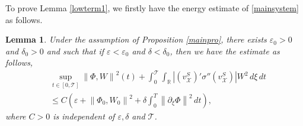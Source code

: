 \documentclass[12pt,reqno]{amsart}
\numberwithin{equation}{section}
\newcommand{\norm}[1]{\left\lVert #1 \right\rVert}
\def\p{\partial}
\def\R{\mathbb{R}}
\def\T{\mathcal{T}}
\def\vsx{v^S_{\mathcal{X}}}
\newtheorem{lemma}[theorem]{Lemma}
\begin{document}
To prove Lemma \ref{lowterm1}, we firstly have the energy estimate of \eqref{mainsystem} as follows.
\begin{lemma}\label{construction}
	Under the assumption of Proposition \ref{mainpro}, there exists $\varepsilon_0>0$ and $\delta_0>0$ and such that if $\varepsilon<\varepsilon_0$ and $\delta<\delta_0$, then we have the estimate as follows,
	\begin{equation}\label{transformestimate}
		\begin{aligned}
			&\mathop{sup}\limits_{t \in [0,\T]}\norm{\Phi,W}^2(t) +\int_{0}^{\T}\int_{\R} |(\vsx)'\sigma''(\vsx)|W^2\,d\xi \,dt\\
			&\leq C(\varepsilon+\norm{\Phi_0,W_0}^2+\delta\int_{0}^{T} \norm{\p_{\xi}\Phi}^2 \,dt ),
		\end{aligned}
	\end{equation}
	where $C>0$ is independent of $\varepsilon,\delta$ and $\T$.
\end{lemma}
\end{document}
